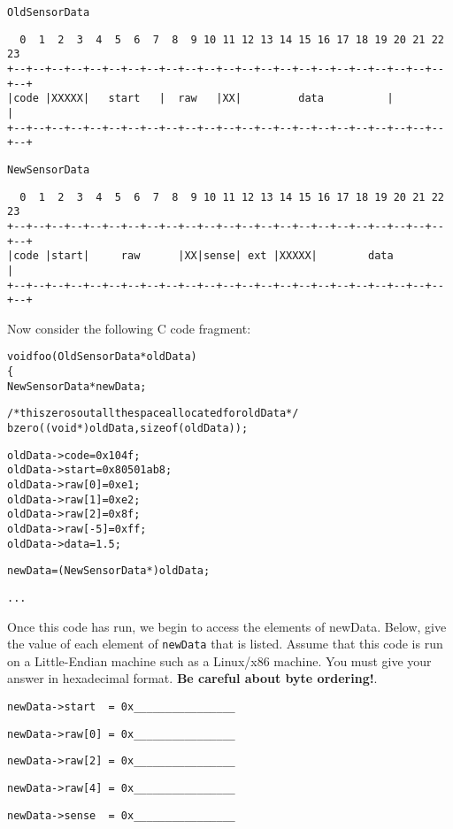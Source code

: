 \begin{subproblem}
{{\tt OldSensorData}

{\small
\begin{verbatim}
  0  1  2  3  4  5  6  7  8  9 10 11 12 13 14 15 16 17 18 19 20 21 22 23 
+--+--+--+--+--+--+--+--+--+--+--+--+--+--+--+--+--+--+--+--+--+--+--+--+
|code |XXXXX|   start   |  raw   |XX|         data          |           |
+--+--+--+--+--+--+--+--+--+--+--+--+--+--+--+--+--+--+--+--+--+--+--+--+
\end{verbatim}
}



{\tt NewSensorData}

{\small
\begin{verbatim} 
  0  1  2  3  4  5  6  7  8  9 10 11 12 13 14 15 16 17 18 19 20 21 22 23 
+--+--+--+--+--+--+--+--+--+--+--+--+--+--+--+--+--+--+--+--+--+--+--+--+
|code |start|     raw      |XX|sense| ext |XXXXX|        data           |
+--+--+--+--+--+--+--+--+--+--+--+--+--+--+--+--+--+--+--+--+--+--+--+--+
\end{verbatim}
}

} %


\newpage

\item
Now consider the following C code fragment:

\begin{ccode}
\begin{alltt}
void foo(OldSensorData *oldData)
\verb:{:
    NewSensorData *newData;

    /* this zeros out all the space allocated for oldData */
    bzero((void *)oldData, sizeof(oldData));

    oldData->code = 0x104f;
    oldData->start = 0x80501ab8;
    oldData->raw[0] = 0xe1;
    oldData->raw[1] = 0xe2;
    oldData->raw[2] = 0x8f;
    oldData->raw[-5] = 0xff;
    oldData->data = 1.5;

    newData = (NewSensorData *) oldData;

    ...
\end{alltt}
\end{ccode}

Once this code has run, we begin to access the elements of newData.  Below,
give the value of each element of {\tt newData} that is listed.  Assume that 
this code is run on a Little-Endian machine such as a Linux/x86 machine.
You must give your answer in hexadecimal format.
{\bf Be careful about byte ordering!}.

\begin{subproblem}
\item \verb:newData->start  = 0x________________: \medskip {}
\item \verb:newData->raw[0] = 0x________________: \medskip {}
\item \verb:newData->raw[2] = 0x________________: \medskip {}
\item \verb:newData->raw[4] = 0x________________: \medskip {}
\item \verb:newData->sense  = 0x________________: \medskip {}
\end{subproblem}

\end{subproblem}



        




